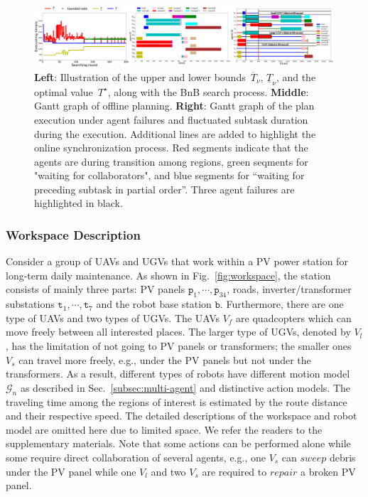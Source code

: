  \begin{figure}
    \centering
        \includegraphics[width=1\textwidth]{figures/simulation/taskfinal/mixed_poset.pdf}
    \caption{\textbf{Left}: Illustration of the upper and lower
bounds~$\overline{T}_\nu,\,\underline{T}_\nu$, and the optimal value~$T^\star$,
along with the BnB search process.
\textbf{Middle}: Gantt graph of offline planning.
\textbf{Right}: Gantt graph of the plan execution under agent failures and fluctuated subtask duration during the execution.
Additional lines are added to highlight the online synchronization process. Red segments indicate that the agents
are during transition among regions, green seqments for "waiting for collaborators", and blue segments for
“waiting for preceding subtask in partial order”. Three agent failures are highlighted in black.
    }
\label{fig:task2-bnb}
\end{figure}

\subsubsection{Workspace Description}\label{subsubsec:ws}

Consider a group of UAVs and UGVs that work within a PV power station for
long-term daily maintenance.
As shown in Fig.~\ref{fig:workspace},
the station consists of mainly three parts: PV panels $\texttt{p}_1,\cdots,\texttt{p}_{34}$, roads,
inverter/transformer substations $\texttt{t}_1,\cdots,\texttt{t}_7$ and the robot base station $\texttt{b}$.
Furthermore, there are one type of UAVs and two types of UGVs.
The UAVs $V_f$ are quadcopters which can move freely between all interested places.
The larger type of UGVs, denoted by $V_l$, has the limitation of not going to PV panels or transformers;
the smaller ones $V_s$ can travel more freely, e.g., under the PV panels but not under the transformers.
As a result, different types of robots have different motion
model~$\mathcal{G}_n$ as described in Sec.~\ref{subsec:multi-agent}
and distinctive action models.
The traveling time among the regions of interest is estimated by the route
distance and their respective speed.
The detailed descriptions of the workspace and robot model are omitted here due to limited space.
We refer the readers to the supplementary materials.
Note that some actions can be performed alone while some require direct
collaboration of several agents,
e.g., one $V_s$ can $sweep$ debris under the PV panel while one $V_l$
and two $V_s$ are required to $repair$ a broken PV panel.







